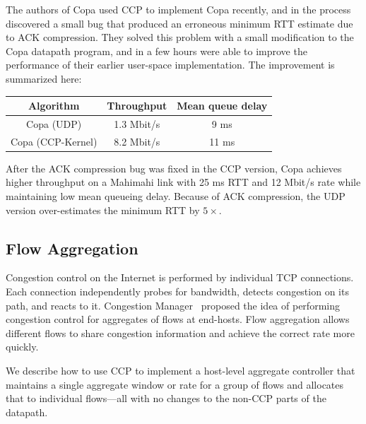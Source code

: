 The authors of Copa used CCP to implement Copa recently, and in the process discovered a small bug that produced an erroneous minimum RTT estimate due to ACK compression. They solved this problem with a small modification to the Copa datapath program,
and in a few hours were able to improve the performance of their earlier user-space implementation. The improvement is summarized here:

\begin{tabular}{c|c|c}
    Algorithm & Throughput & Mean queue delay \\
    \hline
    Copa (UDP) & 1.3 Mbit/s & 9 ms\\
    Copa (CCP-Kernel) & 8.2 Mbit/s  & 11 ms\\
\end{tabular}

\smallskip
After the ACK compression bug was fixed in the CCP version, Copa achieves higher throughput on a Mahimahi link with 25 ms RTT and 12 Mbit/s rate while maintaining low mean queueing delay. Because of ACK compression, the UDP version over-estimates the minimum RTT by $5\times$.


\subsection{Flow Aggregation}
\label{s:capabilities:agg}

Congestion control on the Internet is performed by individual TCP connections. Each connection independently probes for bandwidth, detects congestion on its path, and reacts to it. Congestion Manager~\cite{cm} proposed the idea of performing congestion control for aggregates of flows at end-hosts. Flow aggregation allows different flows to share congestion information and achieve the correct rate more quickly. 

We describe how to use CCP to implement a host-level aggregate controller that maintains a single aggregate window or rate for a group of flows and allocates that to individual flows---all with no changes to the non-CCP parts of the datapath.



